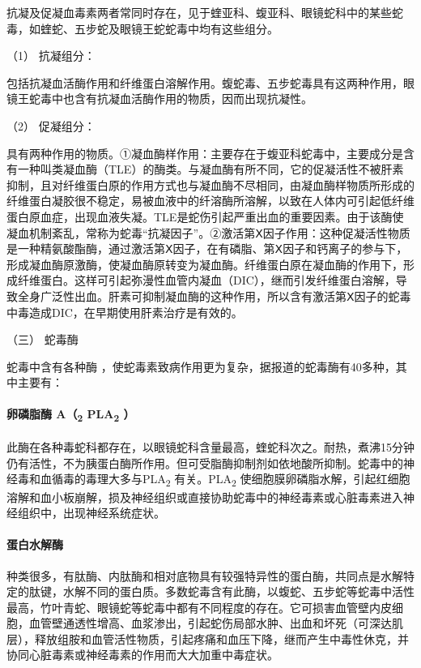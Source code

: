 抗凝及促凝血毒素两者常同时存在，见于蝰亚科、蝮亚科、眼镜蛇科中的某些蛇毒，如蝰蛇、五步蛇及眼镜王蛇蛇毒中均有这些组分。

\hypertarget{text00172.htmlux5cux23CHP5-8-1-1-3-2-3-1}{}
（1） 抗凝组分：

包括抗凝血活酶作用和纤维蛋白溶解作用。蝮蛇毒、五步蛇毒具有这两种作用，眼镜王蛇毒中也含有抗凝血活酶作用的物质，因而出现抗凝性。

\hypertarget{text00172.htmlux5cux23CHP5-8-1-1-3-2-3-2}{}
（2） 促凝组分：

具有两种作用的物质。①凝血酶样作用：主要存在于蝮亚科蛇毒中，主要成分是含有一种叫类凝血酶（TLE）的酶类。与凝血酶有所不同，它的促凝活性不被肝素抑制，且对纤维蛋白原的作用方式也与凝血酶不尽相同，由凝血酶样物质所形成的纤维蛋白凝胶很不稳定，易被血液中的纤溶酶所溶解，以致在人体内可引起低纤维蛋白原血症，出现血液失凝。TLE是蛇伤引起严重出血的重要因素。由于该酶使凝血机制紊乱，常称为蛇毒“抗凝因子”。②激活第Ⅹ因子作用：这种促凝活性物质是一种精氨酸酯酶，通过激活第Ⅹ因子，在有磷脂、第Ⅹ因子和钙离子的参与下，形成凝血酶原激酶，使凝血酶原转变为凝血酶。纤维蛋白原在凝血酶的作用下，形成纤维蛋白。这样可引起弥漫性血管内凝血（DIC），继而引发纤维蛋白溶解，导致全身广泛性出血。肝素可抑制凝血酶的这种作用，所以含有激活第Ⅹ因子的蛇毒中毒造成DIC，在早期使用肝素治疗是有效的。

\hypertarget{text00172.htmlux5cux23CHP5-8-1-1-3-3}{}
（三） 蛇毒酶

蛇毒中含有各种酶
，使蛇毒素致病作用更为复杂，据报道的蛇毒酶有40多种，其中主要有：

\paragraph{卵磷脂酶 A（\textsubscript{2} PLA\textsubscript{2} ）}

此酶在各种毒蛇科都存在，以眼镜蛇科含量最高，蝰蛇科次之。耐热，煮沸15分钟仍有活性，不为胰蛋白酶所作用。但可受脂酶抑制剂如依地酸所抑制。蛇毒中的神经毒和血循毒的毒理大多与PLA\textsubscript{2}
有关。PLA\textsubscript{2}
使细胞膜卵磷脂水解，引起红细胞溶解和血小板崩解，损及神经组织或直接协助蛇毒中的神经毒素或心脏毒素进入神经组织中，出现神经系统症状。

\paragraph{蛋白水解酶}

种类很多，有肽酶、内肽酶和相对底物具有较强特异性的蛋白酶，共同点是水解特定的肽键，水解不同的蛋白质。多数蛇毒含有此酶，以蝮蛇、五步蛇等蛇毒中活性最高，竹叶青蛇、眼镜蛇等蛇毒中都有不同程度的存在。它可损害血管壁内皮细胞，血管壁通透性增高、血浆渗出，引起蛇伤局部水肿、出血和坏死（可深达肌层），释放组胺和血管活性物质，引起疼痛和血压下降，继而产生中毒性休克，并协同心脏毒素或神经毒素的作用而大大加重中毒症状。


